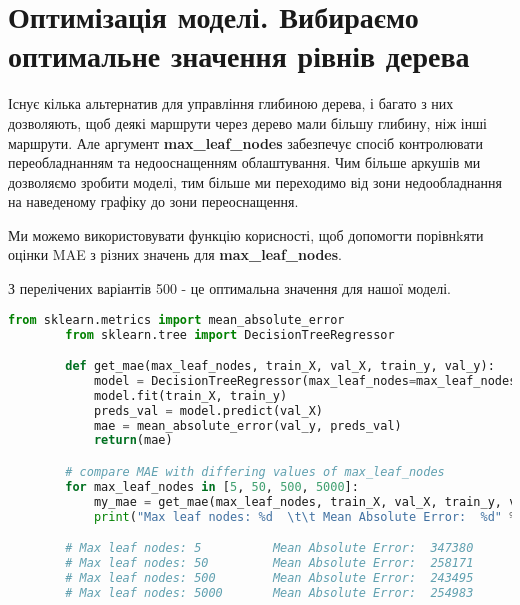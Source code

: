 \chapter{Оптимізація моделі. Вибираємо оптимальне значення рівнів дерева}\label{cha:selecting_number_of_leafs}
Існує кілька альтернатив для управління глибиною дерева, і багато з них дозволяють, щоб деякі маршрути через дерево мали більшу глибину, ніж інші маршрути.
Але аргумент \textbf{max\_leaf\_nodes} забезпечує спосіб контролювати переобладнанням та недооснащенням облаштування. Чим більше аркушів ми дозволяємо зробити моделі, тим більше ми переходимо від зони недообладнання на наведеному графіку до зони переоснащення.

Ми можемо використовувати функцію корисності, щоб допомогти порівнkяти оцінки MAE з різних значень для \textbf{max\_leaf\_nodes}.

З перелічених варіантів 500 - це оптимальна значення для нашої моделі.

\begin{lstlisting}[style=light, language=Python,label={lst:vectorimg},caption=Computing MAE for different value of leaf nodes]
        from sklearn.metrics import mean_absolute_error
        from sklearn.tree import DecisionTreeRegressor

        def get_mae(max_leaf_nodes, train_X, val_X, train_y, val_y):
            model = DecisionTreeRegressor(max_leaf_nodes=max_leaf_nodes, random_state=0)
            model.fit(train_X, train_y)
            preds_val = model.predict(val_X)
            mae = mean_absolute_error(val_y, preds_val)
            return(mae)

        # compare MAE with differing values of max_leaf_nodes
        for max_leaf_nodes in [5, 50, 500, 5000]:
            my_mae = get_mae(max_leaf_nodes, train_X, val_X, train_y, val_y)
            print("Max leaf nodes: %d  \t\t Mean Absolute Error:  %d" %(max_leaf_nodes, my_mae))

        # Max leaf nodes: 5  		 Mean Absolute Error:  347380
        # Max leaf nodes: 50  		 Mean Absolute Error:  258171
        # Max leaf nodes: 500  		 Mean Absolute Error:  243495
        # Max leaf nodes: 5000       Mean Absolute Error:  254983
\end{lstlisting}
